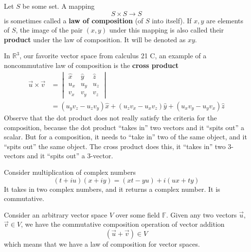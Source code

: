 
Let $S$ be some set. A mapping
\begin{equation}
S\times S\to S
\end{equation}
is sometimes called a \textbf{law of composition} (of $S$
into itself). If $x,y$ are elements of $S$, the image of the
pair $(x,y)$ under this mapping is also called their
\textbf{product} under the law of composition. It will be
denoted as $xy$.
\begin{ex}
In $\mathbb{R}^3$, our favorite vector space from calculus
21 C, an example of a noncommutative law of composition is
the \textbf{cross product}
\begin{subequations}
\begin{align}
\vec{u}\times\vec{v} &= \begin{vmatrix}\hat{x} & \hat{y} & \hat{z}\\
u_{x} & u_{y} & u_{z}\\
v_{x} & v_{y} & v_{z}
\end{vmatrix}\\
&= (u_{y}v_{z}-u_{z}v_{y})\hat{x} +
(u_{z}v_{x}-u_{x}v_{z})\hat{y} + (u_{x}v_{y}-u_{y}v_{x})\hat{z}
\end{align}
\end{subequations}
Observe that the dot product does not really satisfy the
criteria for the composition, because the dot product
``takes in'' two vectors and it ``spits out'' a scalar. But
for a composition, it needs to ``take in'' two of the same
object, and it ``spits out'' the same object. The cross
product does this, it ``takes in'' two 3-vectors and it
``spits out'' a 3-vector. \qef
\end{ex}
\begin{ex}
Consider multiplication of complex numbers
\begin{equation}
(t + iu)(x + iy) = (xt - yu) + i(ux + ty)
\end{equation}
It takes in two complex numbers, and it returns a complex
number. It is commutative. \qef
\end{ex}
\begin{ex}
Consider an arbitrary vector space $V$ over some field
$\mathbb{F}$. Given any two vectors $\vec{u}$, $\vec{v}\in
V$, we have the commutative composition operation of vector
addition
\begin{equation}
(\vec{u}+\vec{v})\in V
\end{equation}
which means that we have a law of composition for vector
spaces. \qef
\end{ex}
